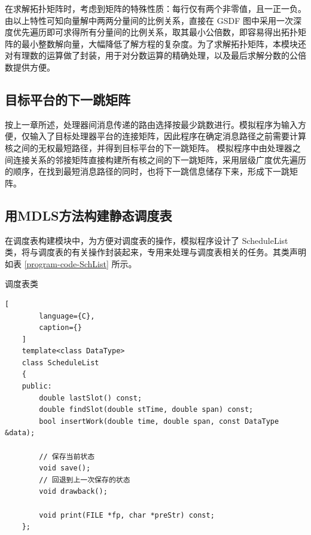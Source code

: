 在求解拓扑矩阵时，考虑到矩阵的特殊性质：每行仅有两个非零值，且一正一负。由以上特性可知向量解中两两分量间的比例关系，直接在 GSDF 图中采用一次深度优先遍历即可求得所有分量间的比例关系，取其最小公倍数，即容易得出拓扑矩阵的最小整数解向量，大幅降低了解方程的复杂度。为了求解拓扑矩阵，本模块还对有理数的运算做了封装，用于对分数运算的精确处理，以及最后求解分数的公倍数提供方便。




\subsection{目标平台的下一跳矩阵}
按上一章所述，处理器间消息传递的路由选择按最少跳数进行。模拟程序为输入方便，仅输入了目标处理器平台的连接矩阵，因此程序在确定消息路径之前需要计算核之间的无权最短路径，并得到目标平台的下一跳矩阵。
模拟程序中由处理器之间连接关系的邻接矩阵直接构建所有核之间的下一跳矩阵，采用层级广度优先遍历的顺序，在找到最短消息路径的同时，也将下一跳信息储存下来，形成下一跳矩阵。



\subsection{用MDLS方法构建静态调度表}

在调度表构建模块中，为方便对调度表的操作，模拟程序设计了 ScheduleList 类，将与调度表的有关操作封装起来，专用来处理与调度表相关的任务。其类声明如表 \ref{program-code-SchList} 所示。

{\renewcommand{\arraystretch}{1.5}
\begin{table}
  \caption{调度表类}
  \label{program-code-SchList}
    \begin{lstlisting}[
        language={C},
        caption={}
    ]
    template<class DataType>
    class ScheduleList
    {
    public:
        double lastSlot() const;
        double findSlot(double stTime, double span) const;
        bool insertWork(double time, double span, const DataType &data);

        // 保存当前状态
        void save();
        // 回退到上一次保存的状态
        void drawback();

        void print(FILE *fp, char *preStr) const;
    };
    \end{lstlisting}
  \end{table}
}

